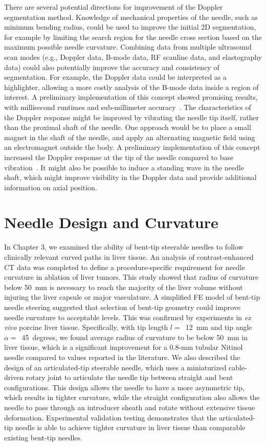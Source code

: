 There are several potential directions for improvement of the Doppler segmentation method. Knowledge of mechanical properties of the needle, such as minimum bending radius, could be used to improve the initial 2D segmentation, for example by limiting the search region for the needle cross section based on the maximum possible needle curvature. Combining data from multiple ultrasound scan modes (e.g., Doppler data, B-mode data, RF scanline data, and elastography data) could also potentially improve the accuracy and consistency of segmentation. For example, the Doppler data could be interpreted as a highlighter, allowing a more costly analysis of the B-mode data inside a region of interest. A preliminary implementation of this concept showed promising results, with millisecond runtimes and sub-millimeter accuracy~\cite{Greer2014}. The characteristics of the Doppler response might be improved by vibrating the needle tip itself, rather than the proximal shaft of the needle. One approach would be to place a small magnet in the shaft of the needle, and apply an alternating magnetic field using an electromagnet outside the body. A preliminary implementation of this concept increased the Doppler response at the tip of the needle compared to base vibration~\cite{Cabreros2014}. It might also be possible to induce a standing wave in the needle shaft, which might improve visibility in the Doppler data and provide additional information on axial position.

\section{Needle Design and Curvature}
In Chapter 3, we examined the ability of bent-tip steerable needles to follow clinically relevant curved paths in liver tissue. An analysis of contrast-enhanced CT data was completed to define a procedure-specific requirement for needle curvature in ablation of liver tumors. This study showed that radius of curvature below 50~mm is necessary to reach the majority of the liver volume without injuring the liver capsule or major vasculature. A simplified FE model of bent-tip needle steering suggested that selection of bent-tip geometry could improve needle curvature to acceptable levels. This was confirmed by experiments in \textit{ex vivo} porcine liver tissue. Specifically, with tip length $l =$~12~mm and tip angle $\alpha =$~45~degrees, we found average radius of curvature to be below 50~mm in liver tissue, which is a significant improvement for a 0.8-mm tubular Nitinol needle compared to values reported in the literature. We also described the design of an articulated-tip steerable needle, which uses a miniaturized cable-driven rotary joint to articulate the needle tip between straight and bent configurations. This design allows the needle to have a more asymmetric tip, which results in tighter curvature, while the straight configuration also allows the needle to pass through an introducer sheath and rotate without extensive tissue deformation. Experimental validation testing demonstrates that the articulated-tip needle is able to achieve tighter curvature in liver tissue than comparable existing bent-tip needles. 

